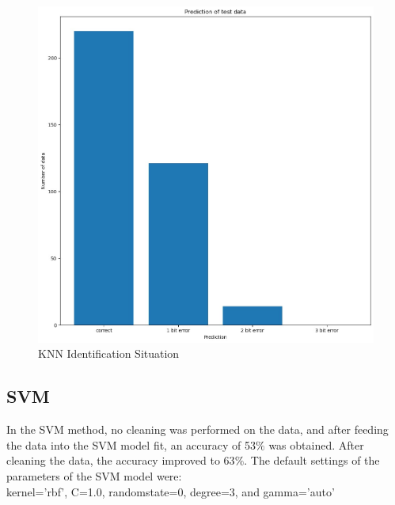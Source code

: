 \documentclass[conference]{IEEEtran}
\begin{document}
{	\begin{figure}[h]
	\label{fig:foo}
	\begin{center}
	\includegraphics[scale=0.15]{KNNBar.jpeg}
	\caption{KNN Identification Situation}
	\end{center}
	\end{figure}

\subsection{SVM}
In the SVM method, no cleaning was performed on the data, and after feeding the data into the SVM model fit, an accuracy of 53$\%$ was obtained. After cleaning the data, the accuracy improved to 63$\%$. The default settings of the parameters of the SVM model were:\\

kernel='rbf', C=1.0, randomstate=0, degree=3, and gamma='auto' \\

}
\end{document}

